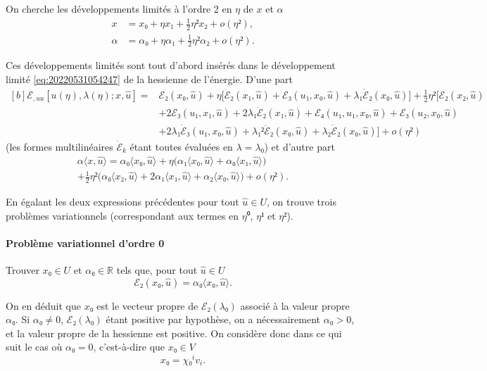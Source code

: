 \documentclass[12pt, final]{scrartcl}
\theoremstyle{definition}
\newcommand{\reals}{\mathbb{R}}
\begin{document}
On cherche les développements limités à l'ordre 2 en \(η\) de \(x\) et \(α\)
\begin{align*}
 x & = x₀ + η x₁ + \tfrac{1}{2} η² x₂ + o(η²),\\
 α & = α₀ + η α₁ + \tfrac{1}{2} η² α₂ + o(η²).
\end{align*}

Ces développements limités sont tout d'abord insérés dans le développement
limité \eqref{eq:20220531054247} de la hessienne de l'énergie. D'une part
\begin{equation*}
  \begin{aligned}[b]
    ℰ_{, u u} [u(η), λ(η); x, \hat{u}] ={}
    & ℰ₂(x₀, \hat{u}) + η \bigl[ ℰ₂(x₁, \hat{u}) + ℰ₃(u₁, x₀, \hat{u}) + λ₁ \dot{ℰ}₂(x₀, \hat{u})\bigr] + \tfrac{1}{2} η² \bigl[ℰ₂(x₂, \hat{u})\\
    & + 2ℰ₃(u₁, x₁, \hat{u}) + 2 λ₁ \dot{ℰ}₂(x₁, \hat{u}) + ℰ₄(u₁, u₁, x₀, \hat{u}) + ℰ₃(u₂, x₀, \hat{u})\\
    & + 2λ₁ \dot{ℰ}₃(u₁, x₀, \hat{u}) + λ₁² \ddot{ℰ}₂(x₀, \hat{u}) + λ₂ \dot{ℰ}₂(x₀, \hat{u}) \bigr] + o(η²)
  \end{aligned}
\end{equation*}
(les formes multilinéaires \(\dot{ℰ}_k\) étant toutes évaluées en \(λ=λ₀\)) et
d'autre part
\begin{multline*}
    α 〈 x, \hat{u} 〉 = α₀ 〈 x₀, \hat{u} 〉 + η\bigl(α₁ 〈 x₀, \hat{u} 〉 + α₀ 〈 x₁, \hat{u} 〉\bigr)\\
    + \tfrac{1}{2} η² \bigl(α₀ 〈 x₂, \hat{u} 〉 + 2 α₁ 〈 x₁, \hat{u} 〉 + α₂ 〈 x₀, \hat{u} 〉\bigr) + o(η²).
\end{multline*}

En égalant les deux expressions précédentes pour tout \(\hat{u} ∈ U\), on trouve
trois problèmes variationnels (correspondant aux termes en \(η⁰\), \(η¹\) et
\(η²\)).

\paragraph{Problème variationnel d'ordre 0} Trouver \(x₀∈U\) et \(α₀∈\reals\)
tels que, pour tout \(\hat{u}∈U\)
\begin{equation}
  ℰ₂(x₀, \hat{u}) = α₀ 〈 x₀, \hat{u} 〉.
\end{equation}

On en déduit que \(x₀\) est le vecteur propre de \(ℰ₂(λ₀)\) associé à la valeur
propre \(α₀\). Si \(α₀ \neq 0\), \(ℰ₂ (λ₀)\) étant positive par hypothèse, on a
nécessairement \(α₀ > 0\), et la valeur propre de la hessienne est positive. On
considère donc dans ce qui suit le cas où \(α₀ = 0\), c'est-à-dire que \(x₀∈V\)
\begin{equation}
  \label{eq:20220609133608}
  x₀ = χ₀^i v_i.
\end{equation}
\end{document}
